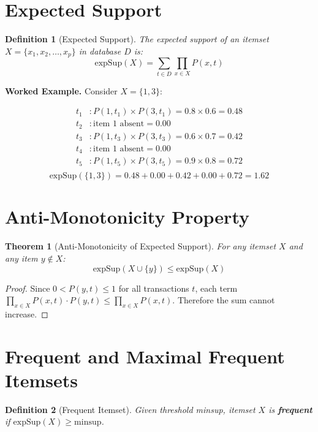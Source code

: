\documentclass[12pt,a4paper]{report}
\newtheorem{theorem}{Theorem}[chapter]
\newtheorem{definition}{Definition}[chapter]
\begin{document}
  \section{Expected Support}

  \begin{definition}[Expected Support]
The expected support of an itemset $X = \{x_1, x_2, \ldots, x_p\}$ in database $D$ is:
\begin{equation}
  \text{expSup}(X) = \sum_{t \in D} \prod_{x \in X} P(x, t)
  \label{eq:expsup}
\end{equation}
  \end{definition}

  \textbf{Worked Example.} Consider $X = \{1, 3\}$:

  \begin{align*}
    t_1&: P(1,t_1) \times P(3,t_1) = 0.8 \times 0.6 = 0.48 \\
    t_2&: \text{item 1 absent} = 0.00 \\
    t_3&: P(1,t_3) \times P(3,t_3) = 0.6 \times 0.7 = 0.42 \\
    t_4&: \text{item 1 absent} = 0.00 \\
    t_5&: P(1,t_5) \times P(3,t_5) = 0.9 \times 0.8 = 0.72 \\
  \end{align*}
  \[ \text{expSup}(\{1, 3\}) = 0.48 + 0.00 + 0.42 + 0.00 + 0.72 = \mathbf{1.62} \]

  \section{Anti-Monotonicity Property}

  \begin{theorem}[Anti-Monotonicity of Expected Support]
For any itemset $X$ and any item $y \notin X$:
\[ \text{expSup}(X \cup \{y\}) \leq \text{expSup}(X) \]
  \end{theorem}

  \begin{proof}
    Since $0 < P(y, t) \leq 1$ for all transactions $t$, each term $\prod_{x \in X} P(x,t) \cdot P(y,t) \leq \prod_{x \in X} P(x,t)$. Therefore the sum cannot increase.
  \end{proof}

  \section{Frequent and Maximal Frequent Itemsets}

  \begin{definition}[Frequent Itemset]
Given threshold minsup, itemset $X$ is \textbf{frequent} if $\text{expSup}(X) \geq \text{minsup}$.
  \end{definition}
\end{document}
